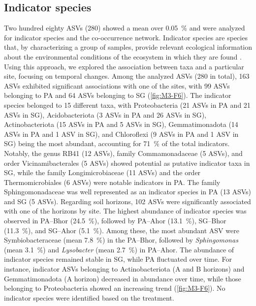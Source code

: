 \subsection{Indicator species}

Two hundred eighty ASVs (\num{280}) showed a mean over \SI{0.05}{\percent} and were analyzed for indicator species and the co-occurrence network. Indicator species are species that, by characterizing a group of samples, provide relevant ecological information about the environmental conditions of the ecosystem in which they are found \citep{Dufrene1997}. Using this approach, we explored the association between taxa and a particular site, focusing on temporal changes. Among the analyzed ASVs (\num{280} in total), 163 ASVs exhibited significant associations with one of the sites, with 99 ASVs belonging to PA and 64 ASVs belonging to SG (\ref{fig:M3-F6}). The indicator species belonged to 15 different taxa, with Proteobacteria (21 ASVs in PA and 21 ASVs in SG), Acidobacteriota (3 ASVs in PA and 26 ASVs in SG), Actinobacteriota (15 ASVs in PA and 5 ASVs in SG), Gemmatimonadota (14 ASVs in PA and 1 ASV in SG), and Chloroflexi (9 ASVs in PA and 1 ASV in SG) being the most abundant, accounting for \SI{71}{\percent} of the total indicators. Notably, the genus RB41 (12 ASVs), family Commamonadaceae (5 ASVs), and order Vicinamibacterales (5 ASVs) showed potential as putative indicator taxa in SG, while the family Longimicrobiaceae (11 ASVs) and the order Thermomicrobiales (6 ASVs) were notable indicators in PA. The family Sphingomonadaceae was well represented as an indicator species in PA (13 ASVs) and SG (5 ASVs). Regarding soil horizons, 102 ASVs were significantly associated with one of the horizons by site. The highest abundance of indicator species was observed in PA--Bhor (\SI{24.5}{\percent}), followed by PA--Ahor (\SI{13.1}{\percent}), SG--Bhor (\SI{11.3}{\percent}), and SG--Ahor (\SI{5.1}{\percent}). Among these, the most abundant ASV were Symbiobacteraceae (mean \SI{7.8}{\percent}) in the PA--Bhor, followed by \textit{Sphingomonas} (mean \SI{3.1}{\percent}) and \textit{Lysobacter} (mean \SI{2.7}{\percent}) in PA--Ahor. The abundance of indicator species remained stable in SG, while PA fluctuated over time. For instance, indicator ASVs belonging to Actinobacteriota (A and B horizons) and Gemmatimonadota (A horizon) decreased in abundance over time, while those belonging to Proteobacteria showed an increasing trend (\ref{fig:M3-F6}). No indicator species were identified based on the treatment.


